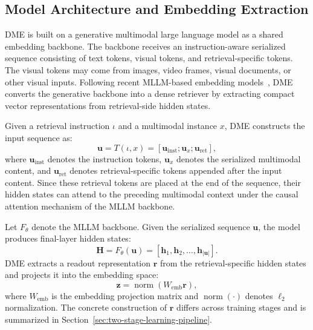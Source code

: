 \subsection{Model Architecture and Embedding Extraction}
\label{sec:model-architecture-embedding}

DME is built on a generative multimodal large language model as a shared embedding backbone. The backbone receives an instruction-aware serialized sequence consisting of text tokens, visual tokens, and retrieval-specific tokens. The visual tokens may come from images, video frames, visual documents, or other visual inputs. Following recent MLLM-based embedding models~\cite{E5-V,GME,MMEB,VLM2VecV2,Qwen3VLEmbedding}, DME converts the generative backbone into a dense retriever by extracting compact vector representations from retrieval-side hidden states.

Given a retrieval instruction $\iota$ and a multimodal instance $x$, DME constructs the input sequence as:
\begin{equation}
    \mathbf{u}
    =
    T(\iota, x)
    =
    [
    \mathbf{u}_{\mathrm{inst}};
    \mathbf{u}_{x};
    \mathbf{u}_{\mathrm{ret}}
    ],
\end{equation}
where $\mathbf{u}_{\mathrm{inst}}$ denotes the instruction tokens, $\mathbf{u}_{x}$ denotes the serialized multimodal content, and $\mathbf{u}_{\mathrm{ret}}$ denotes retrieval-specific tokens appended after the input content. Since these retrieval tokens are placed at the end of the sequence, their hidden states can attend to the preceding multimodal context under the causal attention mechanism of the MLLM backbone.

Let $F_{\theta}$ denote the MLLM backbone. Given the serialized sequence $\mathbf{u}$, the model produces final-layer hidden states:
\begin{equation}
    \mathbf{H}
    =
    F_{\theta}(\mathbf{u})
    =
    [
    \mathbf{h}_1,
    \mathbf{h}_2,
    \ldots,
    \mathbf{h}_{|\mathbf{u}|}
    ].
\end{equation}
DME extracts a readout representation $\mathbf{r}$ from the retrieval-specific hidden states and projects it into the embedding space:
\begin{equation}
    \mathbf{z}
    =
    \operatorname{norm}
    \left(
        W_{\mathrm{emb}}
        \mathbf{r}
    \right),
\end{equation}
where $W_{\mathrm{emb}}$ is the embedding projection matrix and $\operatorname{norm}(\cdot)$ denotes $\ell_2$ normalization. The concrete construction of $\mathbf{r}$ differs across training stages and is summarized in Section~\ref{sec:two-stage-learning-pipeline}.

